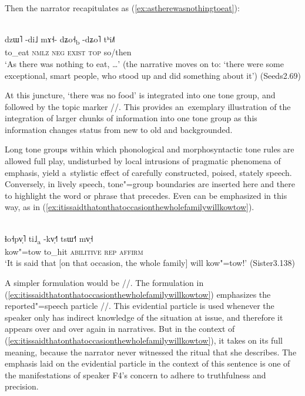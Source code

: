 Then the narrator recapitulates as (\ref{ex:astherewasnothingtoeat}):

\begin{exe}
  \ex
  \label{ex:astherewasnothingtoeat}
  \\
  \gll dzɯ˥	-di˩	mɤ˧-	dʑo˧\textsubscript{b}	-dʑo˥	tʰi˩˥\\
  to\_eat	\textsc{nmlz}	\textsc{neg}	\textsc{exist}	\textsc{top}	so/then\\
  \glt  ‘As there was nothing to eat, {\dots}’ (the narrative moves on to: ‘there were some
  exceptional, smart people, who stood up and did something about it’) (Seeds2.69)
\end{exe}

At this juncture, ‘there was no food’ is integrated into one tone group, and followed by the
topic marker //. This provides an~exemplary illustration of the integration of larger
chunks of information into one tone group as this information changes status from new to
old and backgrounded.

Long tone groups within which phonological and morphosyntactic tone rules are allowed full play, undisturbed by local
intrusions of pragmatic phenomena of emphasis, yield a~stylistic effect of carefully constructed,
poised, stately speech. Conversely, in lively speech, tone"=group boundaries are inserted here and there to highlight the word or
phrase that precedes. Even  can be emphasized in this way, as in (\ref{ex:itissaidthatonthatoccasionthewholefamilywillkowtow}).
\begin{exe}
  \ex
  \label{ex:itissaidthatonthatoccasionthewholefamilywillkowtow}
  \\
  \gll ɬo˧pv̩˥	ti˩\textsubscript{a}	-kv̩˧˥		tsɯ˧˥	mv̩˧\\
  kow"=tow	to\_hit	\textsc{abilitive}	\textsc{rep}	\textsc{affirm}\\
  \glt ‘It is said that [on that occasion, the whole family] will kow"=tow!’ (Sister3.138)
\end{exe}

A simpler formulation would be //. The formulation in
(\ref{ex:itissaidthatonthatoccasionthewholefamilywillkowtow}) emphasizes the reported"=speech
particle //. This evidential particle is used whenever the speaker only has indirect knowledge of the situation at issue, and therefore it appears over and over again in narratives. But in the
context of (\ref{ex:itissaidthatonthatoccasionthewholefamilywillkowtow}), it takes on its full
meaning, because the narrator never witnessed the ritual that she describes. The emphasis laid on
the evidential particle in the context of this sentence is one of the manifestations of speaker F4’s
concern to adhere to truthfulness and precision.

